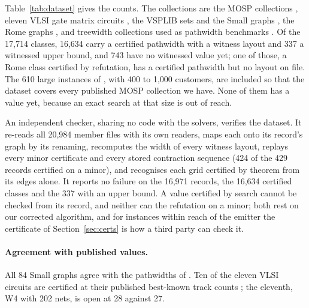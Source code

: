 Table~\ref{tab:dataset} gives the counts. The collections are the MOSP
collections
\citep{SmithGent2005,FaggioliBentivoglio1998,ChuStuckey2009,CarvalhoSoma2015,Frinhani2018},
eleven VLSI gate matrix circuits \citep{OliveiraLorena2002}, the VSPLIB sets
\citep{Duarte2012} and the Small graphs \citep{MartiCamposPinana2008}, the Rome
graphs \citep{DiBattista1997}, and treewidth collections used as pathwidth
benchmarks \citep{TreewidthLIB,freetdi,PACE2016,PACE2017}. Of the 17,714
classes, 16,634 carry a certified pathwidth with a witness layout and 337 a witnessed upper bound, and 743 have no witnessed value yet; one of those, a Rome class certified by refutation, has a certified pathwidth but no layout on file. The 610 large instances of \citet{Frinhani2018}, with
400 to 1,000 customers, are included so that the dataset covers every
published MOSP collection we have. None of them has a value yet, because an
exact search at that size is out of reach.

An independent checker, sharing no code with the solvers, verifies the
dataset. It re-reads all 20,984 member files with its own readers, maps each
onto its record's graph by its renaming, recomputes the width of every witness
layout, replays every minor certificate and every stored contraction sequence
(424 of the 429 records certified on a minor), and recognises each grid
certified by theorem from its edges alone. It reports no failure on the
16,971 records, the 16,634 certified classes and the 337 with an upper bound. A value certified by search cannot be checked from its record,
and neither can the refutation on a minor;
both rest on our corrected algorithm, and for instances within reach of the emitter
the certificate of Section~\ref{sec:certs} is how a third party can check it.

\paragraph{Agreement with published values.} All 84 Small graphs agree with
the pathwidths of \citet[Tables~4--5]{Mallach2018}. Ten of the eleven VLSI
circuits are certified at their published best-known track counts
\citep[Table~I]{OliveiraLorena2002}; the eleventh, W4 with 202 nets, is open
at 28 against 27.

